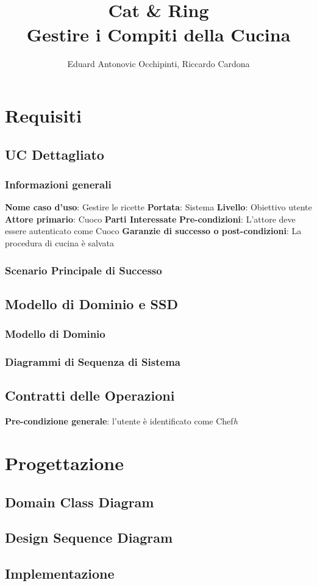\documentclass[letterpaper, italian]{report}
\title{
    \leavevmode{\texttt{[image: resources/img/Universita-degli-studi-di-torino-logo.png]}\newline\newline}\\
    Cat \& Ring \\
    \large Gestire i Compiti della Cucina
}
\author{Eduard Antonovic Occhipinti, Riccardo Cardona}
\begin{document}
\maketitle

\tableofcontents

\part{Requisiti}
\chapter{UC Dettagliato}

\section*{Informazioni generali}
\textbf{Nome caso d'uso}{: Gestire le ricette}\newline
\textbf{Portata}{: Sistema}\newline
\textbf{Livello}{: Obiettivo utente}\newline
\textbf{Attore primario}{: Cuoco}\newline
\textbf{Parti Interessate}\newline
\textbf{Pre-condizioni}{: L'attore deve essere autenticato come Cuoco}\newline
\textbf{Garanzie di successo o post-condizioni}{: La procedura di cucina è salvata}

\section*{Scenario Principale di Successo}

\chapter{Modello di Dominio e SSD}
\section{Modello di Dominio}
\section{Diagrammi di Sequenza di Sistema}

\chapter{Contratti delle Operazioni}
\textbf{Pre-condizione generale}{: l'utente è identificato come Chef}\textit{h}

\part{Progettazione}
\chapter{Domain Class Diagram}
\chapter{Design Sequence Diagram}

\chapter{Implementazione}
\end{document}
